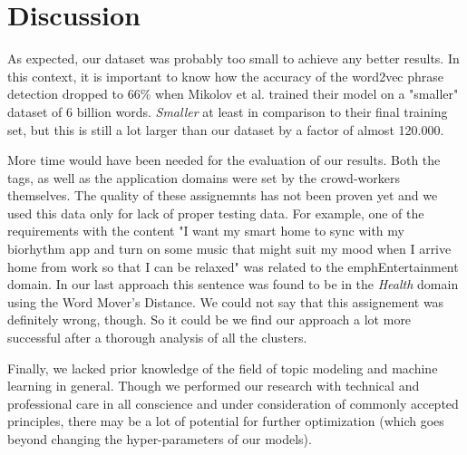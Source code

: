 \section{Discussion}
\label{sec:discussion}
As expected, our dataset was probably too small to achieve any better results. In this context, it is important to know how the accuracy of the word2vec phrase detection dropped to 66\% when Mikolov et al. trained their model on a "smaller" dataset of 6 billion words\cite[p7]{mikolov_distributed_2013}. \emph{Smaller} at least in comparison to their final training set, but this is still a lot larger than our dataset by a factor of almost 120.000.

More time would have been needed for the evaluation of our results. Both the tags, as well as the application domains were set by the crowd-workers themselves. The quality of these assignemnts has not been proven yet and we used this data only for lack of proper testing data. For example, one of the requirements with the content "I want my smart home to sync with my biorhythm app and turn on some music that might suit my mood when I arrive home from work so that I can be relaxed" was related to the emph{Entertainment} domain. In our last approach this sentence was found to be in the \emph{Health} domain using the Word Mover's Distance. We could not say that this assignement was definitely wrong, though. So it could be we find our approach a lot more successful after a thorough analysis of all the clusters.

Finally, we lacked prior knowledge of the field of topic modeling and machine learning in general. Though we performed our research with technical and professional care in all conscience and under consideration of commonly accepted principles, there may be a lot of potential for further optimization (which goes beyond changing the hyper-parameters of our models).